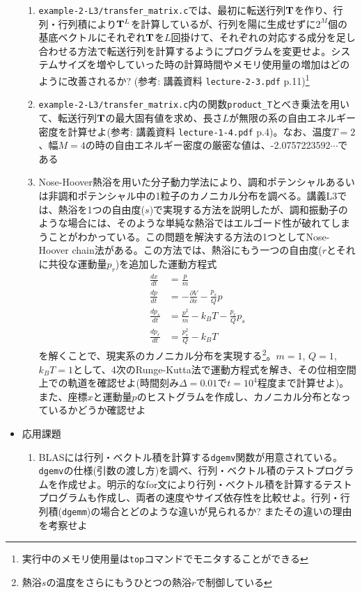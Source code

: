 \documentclass{jarticle}
\begin{document}
\begin{itemize}
\begin{enumerate}
\item {\tt example-2-L3/transfer\_matrix.c}では、最初に転送行列${\bf T}$を作り、行列・行列積により${\bf T}^L$を計算しているが、行列を陽に生成せずに$2^M$個の基底ベクトルにそれぞれ${\bf T}$を$L$回掛けて、それぞれの対応する成分を足し合わせる方法で転送行列を計算するようにプログラムを変更せよ。システムサイズを増やしていった時の計算時間やメモリ使用量の増加はどのように改善されるか? (参考: 講義資料 {\tt lecture-2-3.pdf} p.11)\footnote{実行中のメモリ使用量は{\tt top}コマンドでモニタすることができる}
\item {\tt example-2-L3/transfer\_matrix.c}内の関数{\tt product\_T}とべき乗法を用いて、転送行列${\bf T}$の最大固有値を求め、長さ$L$が無限の系の自由エネルギー密度を計算せよ(参考: 講義資料 {\tt lecture-1-4.pdf} p.4)。なお、温度$T=2$、幅$M=4$の時の自由エネルギー密度の厳密な値は、-2.0757223592$\cdots$である
\item Nose-Hoover熱浴を用いた分子動力学法により、調和ポテンシャルあるいは非調和ポテンシャル中の1粒子のカノニカル分布を調べる。講義L3では、熱浴を1つの自由度($s$)で実現する方法を説明したが、調和振動子のような場合には、そのような単純な熱浴ではエルゴード性が破れてしまうことがわかっている。この問題を解決する方法の1つとしてNose-Hoover chain法がある。この方法では、熱浴にもう一つの自由度($r$とそれに共役な運動量$p_r$)を追加した運動方程式
  \begin{align*}
    \frac{dx}{dt} &= \frac{p}{m} \\
    \frac{dp}{dt} &= -\frac{\partial V}{\partial x} - \frac{p_s}{Q} p \\
    \frac{dp_s}{dt} &= \frac{p^2}{m} - k_B T - \frac{p_r}{Q} p_s \\
    \frac{dp_r}{dt} &= \frac{p_s^2}{Q} - k_B T
  \end{align*}
  を解くことで、現実系のカノニカル分布を実現する\footnote{熱浴$s$の温度をさらにもうひとつの熱浴$r$で制御している}。$m=1$, $Q=1$, $k_BT=1$として、4次のRunge-Kutta法で運動方程式を解き、その位相空間上での軌道を確認せよ(時間刻み$\Delta=0.01$で$t=10^4$程度まで計算せよ)。また、座標$x$と運動量$p$のヒストグラムを作成し、カノニカル分布となっているかどうか確認せよ
  \end{enumerate}
\item 応用課題
  \begin{enumerate}
  \item BLASには行列・ベクトル積を計算する{\tt dgemv}関数が用意されている。{\tt dgemv}の仕様(引数の渡し方)を調べ、行列・ベクトル積のテストプログラムを作成せよ。明示的なfor文により行列・ベクトル積を計算するテストプログラムも作成し、両者の速度やサイズ依存性を比較せよ。行列・行列積({\tt dgemm})の場合とどのような違いが見られるか? またその違いの理由を考察せよ

\end{enumerate}
\end{itemize}
\end{document}
